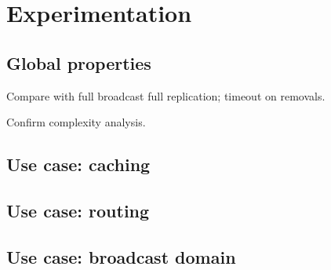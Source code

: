 
\section{Experimentation}
\label{sec:experimentation}

\subsection{Global properties}

Compare with full broadcast full replication; timeout on removals.

Confirm complexity analysis.

\subsection{Use case: caching}

\subsection{Use case: routing}

\subsection{Use case: broadcast domain}

\subsection{}

